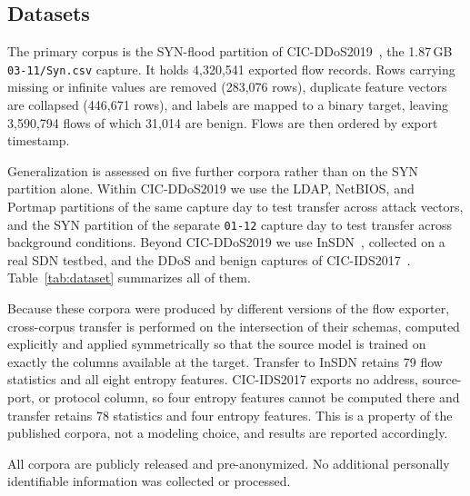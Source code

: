 \documentclass{ieeeaccess}
\begin{document}
\subsection{Datasets}
The primary corpus is the SYN-flood partition of CIC-DDoS2019~\cite{sharafaldin2019ddos}, the 1.87\,GB \texttt{03-11/Syn.csv} capture. It holds 4,320,541 exported flow records. Rows carrying missing or infinite values are removed (283,076 rows), duplicate feature vectors are collapsed (446,671 rows), and labels are mapped to a binary target, leaving 3,590,794 flows of which 31,014 are benign. Flows are then ordered by export timestamp.

Generalization is assessed on five further corpora rather than on the SYN partition alone. Within CIC-DDoS2019 we use the LDAP, NetBIOS, and Portmap partitions of the same capture day to test transfer across attack vectors, and the SYN partition of the separate \texttt{01-12} capture day to test transfer across background conditions. Beyond CIC-DDoS2019 we use InSDN~\cite{elsayed2020insdn}, collected on a real SDN testbed, and the DDoS and benign captures of CIC-IDS2017~\cite{sharafaldin2018cicids}. Table~\ref{tab:dataset} summarizes all of them.

Because these corpora were produced by different versions of the flow exporter, cross-corpus transfer is performed on the intersection of their schemas, computed explicitly and applied symmetrically so that the source model is trained on exactly the columns available at the target. Transfer to InSDN retains 79 flow statistics and all eight entropy features. CIC-IDS2017 exports no address, source-port, or protocol column, so four entropy features cannot be computed there and transfer retains 78 statistics and four entropy features. This is a property of the published corpora, not a modeling choice, and results are reported accordingly.

All corpora are publicly released and pre-anonymized. No additional personally identifiable information was collected or processed.
\end{document}
